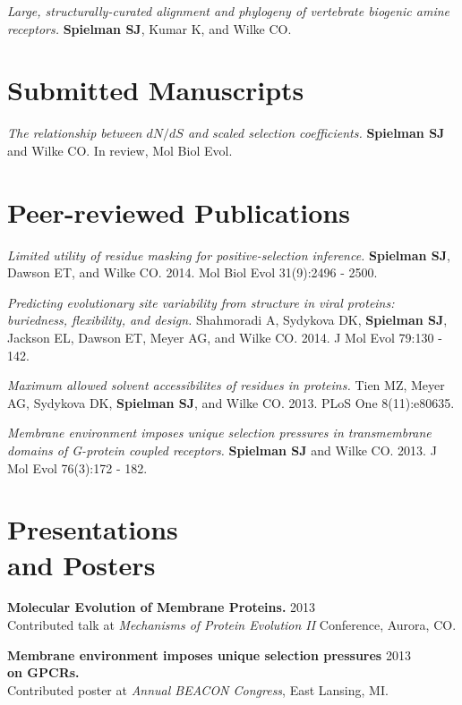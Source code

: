 \documentclass[line, margin]{res}
\begin{document}
\begin{resume}
\emph{Large, structurally-curated alignment and phylogeny of vertebrate biogenic amine receptors.} \textbf{Spielman SJ}, Kumar K, and Wilke CO.

\vspace{0.75cm}

\section{Submitted Manuscripts}

\emph{The relationship between $dN/dS$ and scaled selection coefficients.} \textbf{Spielman SJ} and Wilke CO. In review, Mol Biol Evol.

\vspace{0.75cm}

\section{Peer-reviewed Publications}

\emph{Limited utility of residue masking for positive-selection inference.} \textbf{Spielman SJ}, Dawson ET, and Wilke CO. 2014. Mol Biol Evol 31(9):2496 - 2500.

\emph{Predicting evolutionary site variability from structure in viral proteins: buriedness, flexibility, and design.} Shahmoradi A, Sydykova DK, \textbf{Spielman SJ}, Jackson EL, Dawson ET, Meyer AG, and Wilke CO. 2014. J Mol Evol 79:130 - 142.

\emph{Maximum allowed solvent accessibilites of residues in proteins.} Tien MZ, Meyer AG, Sydykova DK, \textbf{Spielman SJ}, and Wilke CO. 2013. PLoS One 8(11):e80635.

\emph{Membrane environment imposes unique selection pressures in transmembrane domains of G-protein coupled receptors.} \textbf{Spielman SJ} and Wilke CO. 2013. J Mol Evol 76(3):172 - 182.

\vspace{0.75cm}


\section{Presentations \\ and Posters}

\textbf{Molecular Evolution of Membrane Proteins.} \hfill 2013 \\ Contributed talk at \emph{Mechanisms of Protein Evolution II} Conference, Aurora, CO.

\textbf{Membrane environment imposes unique selection pressures} \hfill 2013 \\ \textbf{on GPCRs.} \\ Contributed poster at \emph{Annual BEACON Congress}, East Lansing, MI.


\end{resume}
\end{document}
